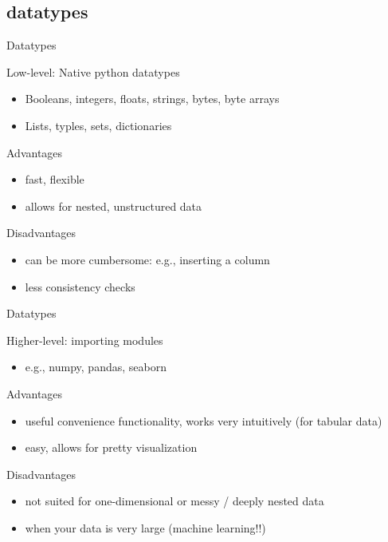 \documentclass[handout]{beamer}
\begin{document}
\subsection{datatypes}
\begin{frame}{Datatypes}
\begin{block}{Low-level: Native python datatypes}
	\begin{itemize}[<+->]
		\item Booleans, integers, floats, strings, bytes, byte arrays
		\item Lists, typles, sets, dictionaries
	\end{itemize}
\end{block}
\pause
\begin{exampleblock}{Advantages }
	\begin{itemize}[<+->]
		\item fast, flexible
		\item allows for nested, unstructured data 
	\end{itemize}
\end{exampleblock}
\pause
\begin{alertblock}{Disadvantages }
	\begin{itemize}[<+->]
		\item can be more cumbersome: e.g., inserting a column
		\item less consistency checks
	\end{itemize}
\end{alertblock}
\end{frame}


\begin{frame}{Datatypes}
\begin{block}{Higher-level: importing modules}
	\begin{itemize}[<+->]
		\item e.g., numpy, pandas, seaborn 
	\end{itemize}
\end{block}
\pause
\begin{exampleblock}{Advantages}
	\begin{itemize}[<+->]
		\item useful convenience functionality, works very intuitively (for tabular data)
		\item easy, allows for pretty visualization
	\end{itemize}
\end{exampleblock}
\pause
\begin{alertblock}{Disadvantages }
	\begin{itemize}[<+->]
		\item not suited for one-dimensional or messy / deeply nested data
		\item when your data is very large (machine learning!!)
	\end{itemize}
\end{alertblock}
\end{frame}
\end{document}
